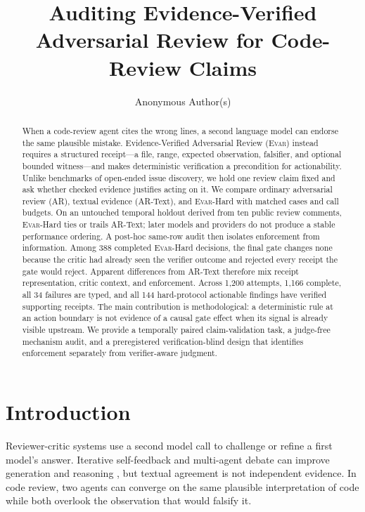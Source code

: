 \documentclass[acmsmall,screen,review,anonymous]{acmart}
\title{Auditing Evidence-Verified Adversarial Review for Code-Review Claims}
\author{Anonymous Author(s)}
\newcommand{\evar}{\textsc{Evar}\xspace}
\begin{document}
\begin{abstract}
When a code-review agent cites the wrong lines, a second language model can endorse the same plausible mistake. Evidence-Verified Adversarial Review (\evar) instead requires a structured receipt---a file, range, expected observation, falsifier, and optional bounded witness---and makes deterministic verification a precondition for actionability. Unlike benchmarks of open-ended issue discovery, we hold one review claim fixed and ask whether checked evidence justifies acting on it. We compare ordinary adversarial review (AR), textual evidence (AR-Text), and \evar-Hard with matched cases and call budgets. On an untouched temporal holdout derived from ten public review comments, \evar-Hard ties or trails AR-Text; later models and providers do not produce a stable performance ordering. A post-hoc same-row audit then isolates enforcement from information. Among 388 completed \evar-Hard decisions, the final gate changes none because the critic had already seen the verifier outcome and rejected every receipt the gate would reject. Apparent differences from AR-Text therefore mix receipt representation, critic context, and enforcement. Across 1,200 attempts, 1,166 complete, all 34 failures are typed, and all 144 hard-protocol actionable findings have verified supporting receipts. The main contribution is methodological: a deterministic rule at an action boundary is not evidence of a causal gate effect when its signal is already visible upstream. We provide a temporally paired claim-validation task, a judge-free mechanism audit, and a preregistered verification-blind design that identifies enforcement separately from verifier-aware judgment.
\end{abstract}

\maketitle

\section{Introduction}

Reviewer-critic systems use a second model call to challenge or refine a first model's answer. Iterative self-feedback and multi-agent debate can improve generation and reasoning \cite{selfrefine,debate}, but textual agreement is not independent evidence. In code review, two agents can converge on the same plausible interpretation of code while both overlook the observation that would falsify it.
\end{document}
